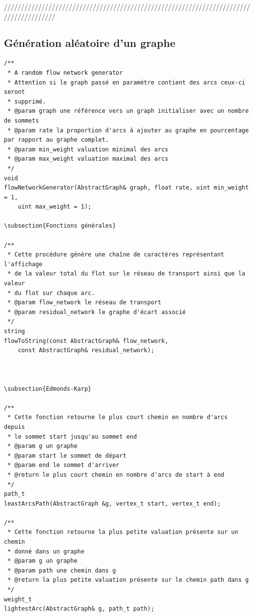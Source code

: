 ///////////////////////////////////////////////////////////////////////////////////////


\subsection{Génération aléatoire d'un graphe}

\begin{verbatim}
/**
 * A random flow network generator
 * Attention si le graph passé en paramètre contient des arcs ceux-ci seront
 * supprimé.
 * @param graph une référence vers un graph initialiser avec un nombre de sommets
 * @param rate la proportion d'arcs à ajouter au graphe en pourcentage par rapport au graphe complet.
 * @param min_weight valuation minimal des arcs
 * @param max_weight valuation maximal des arcs
 */
void
flowNetworkGenerator(AbstractGraph& graph, float rate, uint min_weight = 1,
    uint max_weight = 1);

\subsection{Fonctions générales}

/**
 * Cette procédure génère une chaîne de caractères représentant l'affichage
 * de la valeur total du flot sur le réseau de transport ainsi que la valeur
 * du flot sur chaque arc.
 * @param flow_network le réseau de transport
 * @param residual_network le graphe d'écart associé
 */
string
flowToString(const AbstractGraph& flow_network,
    const AbstractGraph& residual_network);



\subsection{Edmonds-Karp}

/**
 * Cette fonction retourne le plus court chemin en nombre d'arcs depuis
 * le sommet start jusqu'au sommet end
 * @param g un graphe
 * @param start le sommet de départ
 * @param end le sommet d'arriver
 * @return le plus court chemin en nombre d'arcs de start à end
 */
path_t
leastArcsPath(AbstractGraph &g, vertex_t start, vertex_t end);

/**
 * Cette fonction retourne la plus petite valuation présente sur un chemin 
 * donné dans un graphe
 * @param g un graphe
 * @param path une chemin dans g
 * @return la plus petite valuation présente sur le chemin path dans g 
 */
weight_t
lightestArc(AbstractGraph& g, path_t path);


\end{verbatim}
